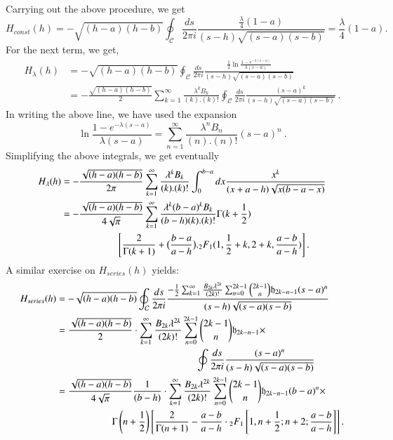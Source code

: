 \documentclass[3p,12pt]{elsarticle}
\numberwithin{equation}{section}
\begin{document}
Carrying out the above procedure, we get
\begin{equation}
H_{const}(h)=-\sqrt{(h-a)(h-b)}\oint_{\mathcal{C}}\frac{ds}{2\pi i}\frac{\frac{\lambda}{4}(1-a)}{(s-h)\sqrt{(s-a)(s-b)}}=\frac{\lambda}{4}(1-a) .
\end{equation}
For the next term, we get,
\begin{equation}
\begin{aligned}
H_{\lambda}(h)&=-\sqrt{(h-a)(h-b)}\oint_{\mathcal{C}}\frac{ds}{2\pi i}\frac{\frac{1}{2}\ln \frac{1-e^{-\lambda(s-a)}}{\lambda(s-a)}}{(s-h)\sqrt{(s-a)(s-b)}}\\
&=-\frac{\sqrt{(h-a)(h-b)}}{2}\sum_{k=1}^{\infty}\frac{\lambda^{k}B_{k}}{(k).(k)!}\oint_{\mathcal{C}}\frac{ds}{2\pi i}\frac{(s-a)^{k}}{(s-h)\sqrt{(s-a)(s-b)}}\ .
\end{aligned}
\end{equation}
In writing the above line, we have used the expansion
\begin{equation}
\ln \frac{1-e^{-\lambda(s-a)}}{\lambda(s-a)}=\sum_{n=1}^{\infty}\frac{\lambda^{n}B_{n}}{(n).(n)!}(s-a)^{n}\ .
\end{equation}
Simplifying the above integrals, we get eventually
\begin{equation}
\begin{aligned}
H_{\lambda}(h)&=-\frac{\sqrt{(h-a)(h-b)}}{2\pi }\sum_{k=1}^{\infty}\frac{\lambda^{k}B_{k}}{(k).(k)!}\int_{0}^{b-a}dx \frac{x^{k}}{(x+a-h)\sqrt{x(b-a-x)}}\\
&=-\frac{\sqrt{(h-a)(h-b)}}{4\sqrt{\pi}}\sum_{k=1}^{\infty}\frac{\lambda^{k}(b-a)^{k}B_{k}}{(b-h)(k).(k)!}\Gamma(k+\frac{1}{2})\\&\hspace*{2cm}\left[\frac{2}{\Gamma(k+1)}+ \big(\frac{b-a}{a-h}\big)._2F_1(1,\frac{1}{2}+k,2+k,\frac{a-b}{a-h})\right] .
\end{aligned}
\end{equation}
A similar exercise on $H_{series}(h)$ yields:
\begin{equation}
\begin{aligned}
H_{series}(h)&=-\sqrt{(h-a)(h-b)}\oint_{\mathcal{C}}\frac{ds}{2\pi i}\frac{-\frac{1}{2}\sum_{k=1}^{\infty}\frac{B_{2k}\lambda^{2k}}{(2k)!}\sum_{n=0}^{2k-1} {2k-1 \choose n}\mathfrak{h}_{2k-n-1}(s-a)^n}{(s-h)\sqrt{(s-a)(s-b)}}\\
&=\frac{\sqrt{(h-a)(h-b)}}{2}\cdot \sum_{k=1}^{\infty}\frac{B_{2k}\lambda^{2k}}{(2k)!}\sum_{n=0}^{2k-1} {2k-1 \choose n}\mathfrak{h}_{2k-n-1}\times\\&\hspace*{5cm} \oint \frac{ds}{2\pi i}
\frac{(s-a)^n}{(s-h)\sqrt{(s-a)(s-b)}}\\
&=\frac{\sqrt{(h-a)(h-b)}}{4\sqrt{\pi}}\frac{1}{(b-h)}\cdot \sum_{k=1}^{\infty}\frac{B_{2k}\lambda^{2k}}{(2k)!}\sum_{n=0}^{2k-1} {2k-1 \choose n}\mathfrak{h}_{2k-n-1}(b-a)^n\times\\
&\hspace*{2cm}\Gamma\left(n+\frac{1}{2}\right)\left[\frac{2}{\Gamma(n+1)}-\frac{a-b}{a-h}\cdot {_2F_1\left[1,n+\frac{1}{2};n+2; \frac{a-b}{a-h}\right]}\right] .
\end{aligned}
\end{equation}
\end{document}
